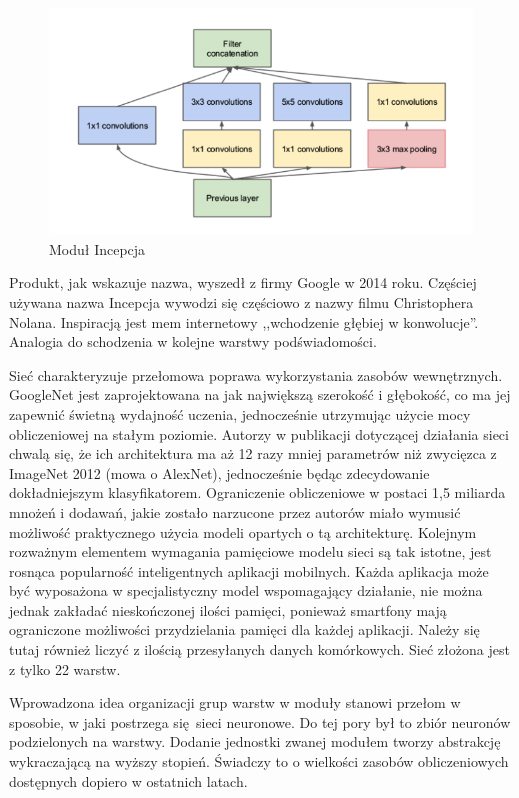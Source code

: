 \documentclass[12pt,a4paper,twoside,titlepage,openright]{book}
\begin{document}
\begin{figure}[ht]
	\centering
			\includegraphics[resolution=100, scale=0.7]{inceptionModule.png}
		\caption{Moduł Incepcja}
\end{figure}

Produkt, jak wskazuje nazwa, wyszedł z firmy Google w 2014 roku. Częściej używana nazwa Incepcja wywodzi się częściowo z nazwy filmu Christophera Nolana. Inspiracją jest mem internetowy ,,wchodzenie głębiej w konwolucje''. Analogia do schodzenia w kolejne warstwy podświadomości.\cite{siteDeeper}

Sieć charakteryzuje przełomowa poprawa wykorzystania zasobów wewnętrznych. GoogleNet jest zaprojektowana na jak największą szerokość i głębokość, co ma jej zapewnić świetną wydajność uczenia, jednocześnie utrzymując użycie mocy obliczeniowej na stałym poziomie. Autorzy w publikacji dotyczącej działania sieci chwalą się, że ich architektura ma aż 12 razy mniej parametrów niż zwycięzca z ImageNet 2012 (mowa o AlexNet), jednocześnie będąc zdecydowanie dokładniejszym klasyfikatorem. Ograniczenie obliczeniowe w postaci 1,5 miliarda mnożeń i dodawań, jakie zostało narzucone przez autorów miało wymusić możliwość praktycznego użycia modeli opartych o tą architekturę. Kolejnym rozważnym elementem wymagania pamięciowe modelu sieci są tak istotne, jest rosnąca popularność inteligentnych aplikacji mobilnych. Każda aplikacja może być wyposażona w specjalistyczny model wspomagający działanie, nie można jednak zakładać nieskończonej ilości pamięci, ponieważ smartfony mają ograniczone możliwości przydzielania pamięci dla każdej aplikacji. Należy się tutaj również liczyć z ilością przesyłanych danych komórkowych. Sieć złożona jest z tylko 22 warstw.

Wprowadzona idea organizacji grup warstw w moduły stanowi przełom w sposobie, w jaki postrzega się sieci neuronowe. Do tej pory był to zbiór neuronów podzielonych na warstwy. Dodanie jednostki zwanej modułem tworzy abstrakcję wykraczającą na wyższy stopień. Świadczy to o wielkości zasobów obliczeniowych dostępnych dopiero w ostatnich latach. \cite{DBLP:journals/corr/SzegedyLJSRAEVR14}
\end{document}

